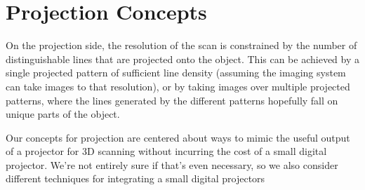 \documentclass[10pt]{article}
\begin{document}
\section{Projection Concepts}
On the projection side, the resolution of the scan is constrained by the number
of distinguishable lines that are projected onto the object.  This can be achieved by a single projected pattern of sufficient line density (assuming the imaging system can take images to that resolution), or by taking images over multiple projected patterns, where the lines generated by the different patterns hopefully fall on unique parts of the object.

Our concepts for projection are centered about ways to mimic the useful output
of a projector for 3D scanning without incurring the cost of a small digital
projector. We're not entirely sure if that's even necessary, so we also consider
different techniques for integrating a small digital projectors
\end{document}
